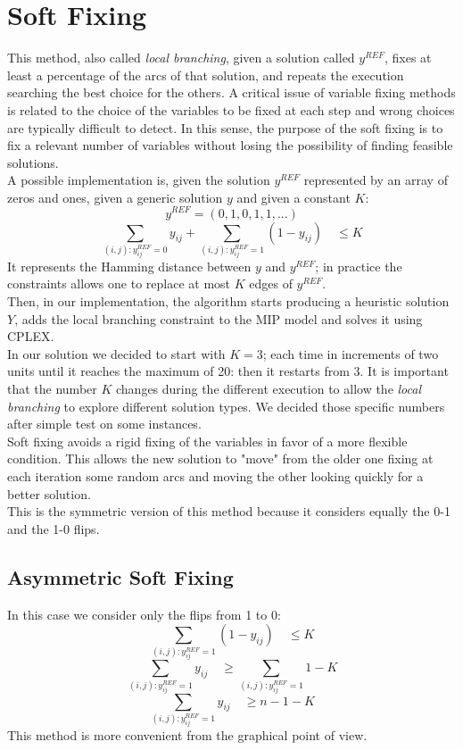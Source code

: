 \section{Soft Fixing}
This method, also called \textit{local branching}, given a solution called $y^{REF}$, fixes at least a percentage of the arcs of that solution, and repeats the execution searching the best choice for the others. A critical issue of variable fixing methods is related to the choice of the variables to be fixed at each step and wrong choices are typically difficult to detect. In this sense, the purpose of the soft fixing is to fix a relevant number of variables without losing the possibility of finding feasible solutions.\\
A possible implementation is, given the solution $y^{REF}$ represented by an array of zeros and ones, given a generic solution $y$ and given a constant $K$:
\[
	y^{REF} = (0,1,0,1,1,...)
\]
\[
	\sum_{(i,j):y^{REF}_{ij}=0} y_{ij} + \sum_{(i,j):y^{REF}_{ij}=1} (1-y_{ij}) \quad \leq K
\]
It represents the Hamming distance between $y$ and $y^{REF}$; in practice the constraints allows one to replace at most $K$ edges of $y^{REF}$. \\
Then, in our implementation, the algorithm starts producing a heuristic solution $Y$, adds the local branching constraint to the MIP model and solves it using \textsc{CPLEX}.\\
In our solution we decided to start with $K=3$; each time in increments of two units until it reaches the maximum of 20: then it restarts from 3. It is important that the number $K$ changes during the different execution to allow the \textit{local branching} to explore different solution types. We decided those specific numbers after simple test on some instances.\\
Soft fixing avoids a rigid fixing of the variables in favor of a more flexible condition. This allows the new solution to "move" from the older one fixing at each iteration some random arcs and moving the other looking quickly for a better solution.\\
This is the symmetric version of this method because it considers equally the 0-1 and the 1-0 flips. 
\newpage
\subsection{Asymmetric Soft Fixing}
In this case we consider only the flips from 1 to 0:
\[
	\sum_{(i,j):y^{REF}_{ij}=1} (1-y_{ij}) \quad \leq K
\]
\[
	\sum_{(i,j):y^{REF}_{ij}=1} y_{ij} \quad \geq \sum_{(i,j):y^{REF}_{ij}=1} 1 - K
\]
\[
	\sum_{(i,j):y^{REF}_{ij}=1} y_{ij} \quad \geq n - 1 - K
\]
This method is more convenient from the graphical point of view. 
